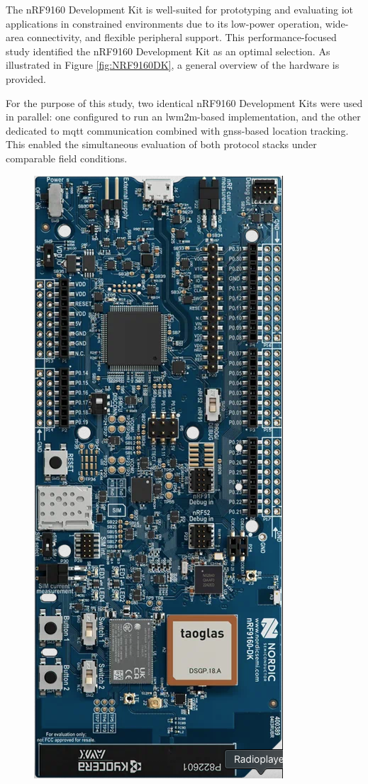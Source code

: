 \documentclass[12pt, english, openany]{book}
\begin{document}
The nRF9160 Development Kit is well-suited for prototyping and evaluating \gls{iot} applications in constrained environments due to its low-power operation, wide-area connectivity, and flexible peripheral support. This performance-focused study identified the nRF9160 Development Kit as an optimal selection. As illustrated in Figure \ref{fig:NRF9160DK}, a general overview of the hardware is provided.

For the purpose of this study, two identical nRF9160 Development Kits were used in parallel: one configured to run an \gls{lwm2m}-based implementation, and the other dedicated to \gls{mqtt} communication combined with \gls{gnss}-based location tracking. This enabled the simultaneous evaluation of both protocol stacks under comparable field conditions.


\begin{figure}[htbp]
    \centering
    \includegraphics[scale=0.6]{nrf9160DK.png}

\end{figure}
\end{document}
